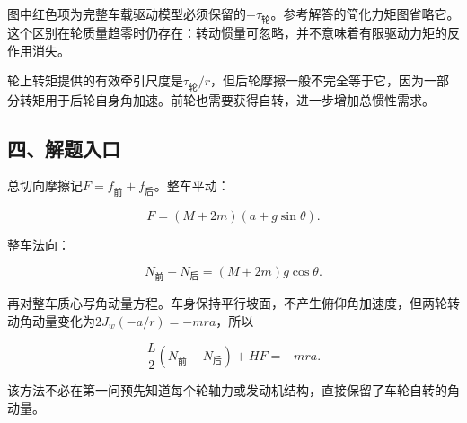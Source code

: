 \documentclass[12pt,a4paper,fontset=fandol]{ctexart}
\begin{document}
\begin{center}
\begin{minipage}{\linewidth}
\centering\begingroup{}
\ifdim\wd\diagrambox>.88\linewidth
\sbox{\diagrambox}{\resizebox{.88\linewidth}{!}{\usebox{\diagrambox}}}\fi
\ifdim\ht\diagrambox>.38\textheight
\resizebox{!}{.38\textheight}{\usebox{\diagrambox}}
\else\usebox{\diagrambox}\fi
\par{}\endgroup\end{minipage}\end{center}

图中红色项为完整车载驱动模型必须保留的\(+\tau_{\text{轮}}\)。参考解答的简化力矩图省略它。这个区别在轮质量趋零时仍存在：转动惯量可忽略，并不意味着有限驱动力矩的反作用消失。

轮上转矩提供的有效牵引尺度是\(\tau_{\text{轮}}/r\)，但后轮摩擦一般不完全等于它，因为一部分转矩用于后轮自身角加速。前轮也需要获得自转，进一步增加总惯性需求。

\subsection{四、解题入口}\label{ux56dbux89e3ux9898ux5165ux53e3-6}

总切向摩擦记\(F=f_{\text{前}}+f_{\text{后}}\)。整车平动：

\[
F=(M+2m)(a+g\sin\theta).
\]

整车法向：

\[
N_{\text{前}}+N_{\text{后}}=(M+2m)g\cos\theta.
\]

再对整车质心写角动量方程。车身保持平行坡面，不产生俯仰角加速度，但两轮转动角动量变化为\(2J_w(-a/r)=-mra\)，所以

\[
\frac L2(N_{\text{前}}-N_{\text{后}})+HF=-mra.
\]

该方法不必在第一问预先知道每个轮轴力或发动机结构，直接保留了车轮自转的角动量。
\end{document}
